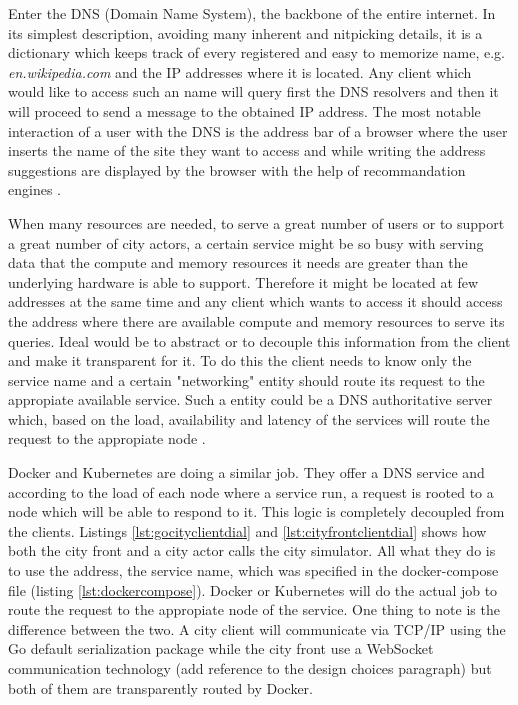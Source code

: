 \documentclass[conference]{IEEEtran}
\begin{document}
Enter the DNS (Domain Name System), the backbone of the entire internet. In its simplest description, avoiding many inherent and nitpicking details, it is a dictionary which keeps track of every registered and easy to memorize name, e.g. \textit{en.wikipedia.com} and the IP addresses where it is located. Any client which would like to access such an name will query first the DNS resolvers and then it will proceed to send a message to the obtained IP address. The most notable interaction of a user with the DNS is the address bar of a browser where the user inserts the name of the site they want to access and while writing the address suggestions are displayed by the browser with the help of recommandation engines \cite{risley2001domain}.

When many resources are needed, to serve a great number of users or to support a great number of city actors, a certain service might be so busy with serving data that the compute and memory resources it needs are greater than the underlying hardware is able to support. Therefore it might be located at few addresses at the same time and any client which wants to access it should access the address where there are available compute and memory resources to serve its queries. Ideal would be to abstract or to decouple this information from the client and make it transparent for it. To do this the client needs to know only the service name and a certain "networking" entity should route its request to the appropiate available service. Such a entity could be a DNS authoritative server which, based on the load, availability and latency of the services will route the request to the appropiate node \cite{swildens2006scalable}.

Docker and Kubernetes are doing a similar job. They offer a DNS service and according to the load of each node where a service run, a request is rooted to a node which will be able to respond to it. This logic is completely decoupled from the clients. Listings \ref{lst:gocityclientdial} and \ref{lst:cityfrontclientdial} shows how both the city front and a city actor calls the city simulator. All what they do is to use the address, the service name, which was specified in the docker-compose file (listing \ref{lst:dockercompose}). Docker or Kubernetes will do the actual job to route the request to the appropiate node of the service. One thing to note is the difference between the two. A city client will communicate via TCP/IP using the Go default serialization package while the city front use a WebSocket communication technology (add reference to the design choices paragraph) but both of them are transparently routed by Docker.
\end{document}
